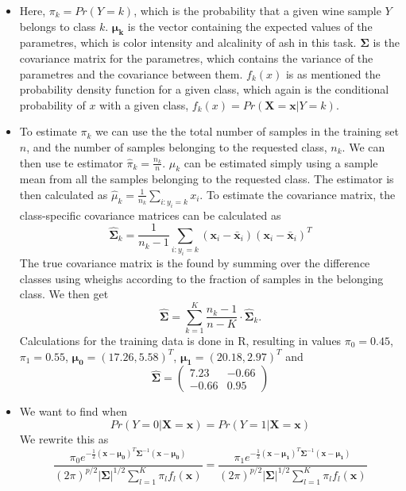 \documentclass[]{article}
\begin{document}
\begin{itemize}
\item
  Here, \(\pi_k=Pr(Y=k)\), which is the probability that a given wine
  sample \(Y\) belongs to class \(k\). \(\boldsymbol{\mu_k}\) is the
  vector containing the expected values of the parametres, which is
  color intensity and alcalinity of ash in this task.
  \(\boldsymbol{\Sigma}\) is the covariance matrix for the parametres,
  which contains the variance of the parametres and the covariance
  between them. \(f_k(x)\) is as mentioned the probability density
  function for a given class, which again is the conditional probability
  of \(x\) with a given class,
  \(f_k(x)=Pr(\boldsymbol{X}=\boldsymbol{x}|Y=k)\).
\item
  To estimate \(\pi_k\) we can use the the total number of samples in
  the training set \(n\), and the number of samples belonging to the
  requested class, \(n_k\). We can then use te estimator
  \(\hat{\pi}_k=\frac{n_k}{n}\). \(\mu_k\) can be estimated simply using
  a sample mean from all the samples belonging to the requested class.
  The estimator is then calculated as
  \(\hat{\mu}_k=\frac{1}{n_k}\sum_{i:y_i=k}x_i\). To estimate the
  covariance matrix, the class-specific covariance matrices can be
  calculated as
  \[\hat{\boldsymbol{\Sigma}}_k=\frac{1}{n_k-1}\sum_{i:y_i=k}(\boldsymbol{x}_i-\bar{\boldsymbol{x}}_i)(\boldsymbol{x}_i-\bar{\boldsymbol{x}}_i)^T\]
  The true covariance matrix is the found by summing over the difference
  classes using wheighs according to the fraction of samples in the
  belonging class. We then get
  \[\hat{\boldsymbol{\Sigma}}=\sum_{k=1}^K \frac{n_k-1}{n-K}\cdot \hat{\boldsymbol{\Sigma}}_k.\]
  Calculations for the training data is done in R, resulting in values
  \(\pi_0=0.45\), \(\pi_1=0.55\),
  \(\boldsymbol{\mu_0}=(17.26 , 5.58)^T\),
  \(\boldsymbol{\mu_1}=(20.18, 2.97)^T\) and \[
  \hat{\boldsymbol{\Sigma}}=
  \left(\begin{array}{cc}
  7.23 & -0.66\\
  -0.66 & 0.95
  \end{array}\right)
  \]
\item
  We want to find when
  \[Pr(Y=0|\boldsymbol{X}=\boldsymbol{x})=Pr(Y=1|\boldsymbol{X}=\boldsymbol{x})\]
  We rewrite this as
  \[\frac{\pi_0 e^{-\frac{1}{2} (\boldsymbol{x}-\boldsymbol{\mu_0})^T\boldsymbol{\Sigma}^{-1}(\boldsymbol{x}-\boldsymbol{\mu_0})}}{(2\pi)^{p/2}|\boldsymbol{\Sigma}|^{1/2} \sum_{l=1}^K \pi_l f_l(\boldsymbol{x})}=\frac{\pi_1 e^{-\frac{1}{2} (\boldsymbol{x}-\boldsymbol{\mu_1})^T\boldsymbol{\Sigma}^{-1}(\boldsymbol{x}-\boldsymbol{\mu_1})}}{(2\pi)^{p/2}|\boldsymbol{\Sigma}|^{1/2} \sum_{l=1}^K \pi_l f_l(\boldsymbol{x})}\]

\end{itemize}
\end{document}
